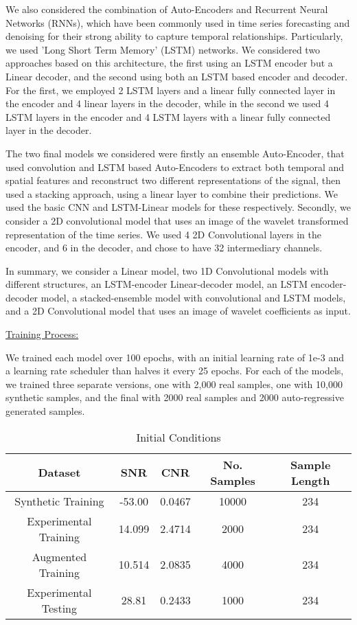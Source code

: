\documentclass[9pt]{article}
\begin{document}
We also considered the combination of Auto-Encoders and Recurrent Neural Networks (RNNs), which have been commonly used in time series forecasting and denoising for their strong ability to capture temporal relationships. Particularly, we used 'Long Short Term Memory' (LSTM) networks. We considered two approaches based on this architecture, the first using an LSTM encoder but a Linear decoder, and the second using both an LSTM based encoder and decoder. For the first, we employed 2 LSTM layers and a linear fully connected layer in the encoder and 4 linear layers in the decoder, while in the second we used 4 LSTM layers in the encoder and 4 LSTM layers with a linear fully connected layer in the decoder.

The two final models we considered were firstly an ensemble Auto-Encoder, that used convolution and LSTM based Auto-Encoders to extract both temporal and spatial features and reconstruct two different representations of the signal, then used a stacking approach, using a linear layer to combine their predictions. We used the basic CNN and LSTM-Linear models for these respectively. Secondly, we consider a 2D convolutional model that uses an image of the wavelet transformed representation of the time series. We used 4 2D Convolutional layers in the encoder, and 6 in the decoder, and chose to have 32 intermediary channels.

In summary, we consider a Linear model, two 1D Convolutional models with different structures, an LSTM-encoder Linear-decoder model, an LSTM encoder-decoder model, a stacked-ensemble model with convolutional and LSTM models, and a 2D Convolutional model that uses an image of wavelet coefficients as input. 

\ul{Training Process:}

We trained each model over 100 epochs, with an initial learning rate of 1e-3 and a learning rate scheduler than halves it every 25 epochs. For each of the models, we trained three separate versions, one with 2,000 real samples, one with 10,000 synthetic samples, and the final with 2000 real samples and 2000 auto-regressive generated samples.
\begin{table}[h]
\centering
\begin{tabular}{|c|c|c|c|c|}
\hline
Dataset & SNR & CNR & No. Samples & Sample Length\\
\hline
Synthetic Training &-53.00&0.0467&10000&234\\
Experimental Training &14.099&2.4714&2000&234\\
Augmented Training &10.514&2.0835&4000&234\\
Experimental Testing & 28.81 &0.2433 &1000&234\\
\end{tabular}
\caption{Initial Conditions}
\end{table}
\end{document}
